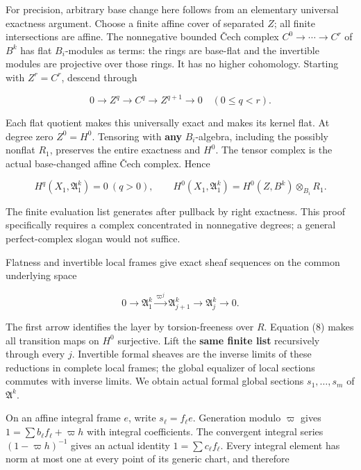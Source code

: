 \documentclass[
  11pt,
]{article}
\begin{document}
For precision, arbitrary base change here follows from an elementary
universal exactness argument. Choose a finite affine cover of separated
\(Z\); all finite intersections are affine. The nonnegative bounded Čech
complex \(C^0\to\cdots\to C^r\) of \(B^k\) has flat \(B_i\)-modules as
terms: the rings are base-flat and the invertible modules are projective
over those rings. It has no higher cohomology. Starting with
\(Z^r=C^r\), descend through

\[
 0\longrightarrow Z^q\longrightarrow C^q
    \longrightarrow Z^{q+1}\longrightarrow0 \quad(0\leq q<r).
\]

Each flat quotient makes this universally exact and makes its kernel
flat. At degree zero \(Z^0=H^0\). Tensoring with \textbf{any}
\(B_i\)-algebra, including the possibly nonflat \(R_1\), preserves the
entire exactness and \(H^0\). The tensor complex is the actual
base-changed affine Čech complex. Hence

\[
 H^q(X_1,\mathfrak A_1^k)=0\ (q>0),\qquad
 H^0(X_1,\mathfrak A_1^k)=H^0(Z,B^k)\otimes_{B_i}R_1.             \tag{8}
\]

The finite evaluation list generates after pullback by right exactness.
This proof specifically requires a complex concentrated in nonnegative
degrees; a general perfect-complex slogan would not suffice.

Flatness and invertible local frames give exact sheaf sequences on the
common underlying space

\[
 0\longrightarrow\mathfrak A_1^k
 \xrightarrow{\,\varpi^j\,}\mathfrak A_{j+1}^k
 \longrightarrow\mathfrak A_j^k\longrightarrow0.                  \tag{9}
\]

The first arrow identifies the layer by torsion-freeness over \(R\).
Equation (8) makes all transition maps on \(H^0\) surjective. Lift the
\textbf{same finite list} recursively through every \(j\). Invertible
formal sheaves are the inverse limits of these reductions in complete
local frames; the global equalizer of local sections commutes with
inverse limits. We obtain actual formal global sections
\(s_1,\ldots,s_m\) of \(\mathfrak A^k\).

On an affine integral frame \(e\), write \(s_\ell=f_\ell e\). Generation
modulo \(\varpi\) gives \(1=\sum b_\ell f_\ell+\varpi h\) with integral
coefficients. The convergent integral series \((1-\varpi h)^{-1}\) gives
an actual identity \(1=\sum c_\ell f_\ell\). Every integral element has
norm at most one at every point of its generic chart, and therefore
\end{document}
